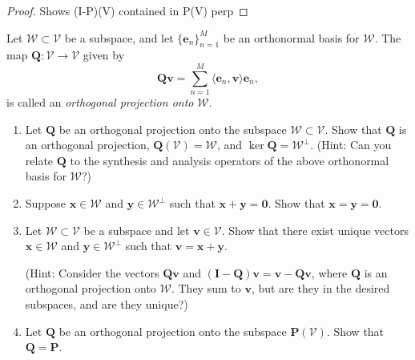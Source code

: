 \documentclass[12pt]{amsart}
\newcommand{\1}{\mathbbm{1}}
\numberwithin{equation}{section}
\numberwithin{Theorem}{section}
\theoremstyle{plain} %
\theoremstyle{definition}
\theoremstyle{remark}
\begin{document}
\begin{enumerate}[1.]
\begin{enumerate}[(a)]
\begin{proof}
		Shows (I-P)(V)  contained in P(V) perp
		
		
	\end{proof}
	
\end{enumerate}

\clearpage

\noindent Let \(\mathcal{W}\subset\mathcal{V}\) be a subspace, and let \(\{\mathbf{e}_{n}\}_{n=1}^{M}\) be an orthonormal basis for \(\mathcal{W}\). The map \(\mathbf{Q}:\mathcal{V}\to\mathcal{V}\) given by
\[\mathbf{Qv} = \sum_{n=1}^{M}\langle \mathbf{e}_{n},\mathbf{v}\rangle\mathbf{e}_{n},\]
is called an \textit{orthogonal projection onto }\(\mathcal{W}\).\bigskip

\begin{enumerate}
\addtocounter{enumii}{3}

\item  Let \(\mathbf{Q}\) be an orthogonal projection onto the subspace \(\mathcal{W}\subset\mathcal{V}\). Show that \(\mathbf{Q}\) is an orthogonal projection, \(\mathbf{Q}(\mathcal{V}) = \mathcal{W}\), and \(\operatorname{ker}\mathbf{Q} = \mathcal{W}^{\bot}\). (Hint: Can you relate \(\mathbf{Q}\) to the synthesis and analysis operators of the above orthonormal basis for \(\mathcal{W}\)?)\bigskip

\item Suppose \(\mathbf{x}\in\mathcal{W}\) and \(\mathbf{y}\in\mathcal{W}^{\bot}\) such that \(\mathbf{x}+\mathbf{y}=\mathbf{0}\). Show that \(\mathbf{x}=\mathbf{y}=\mathbf{0}\).\bigskip

\item Let \(\mathcal{W}\subset\mathcal{V}\) be a subspace and let \(\mathbf{v}\in\mathcal{V}\). Show that there exist unique vectors \(\mathbf{x}\in\mathcal{W}\) and \(\mathbf{y}\in\mathcal{W}^{\bot}\) such that \(\mathbf{v} = \mathbf{x}+\mathbf{y}\).

(Hint: Consider the vectors \(\mathbf{Qv}\) and \((\mathbf{I}-\mathbf{Q})\mathbf{v} = \mathbf{v} -\mathbf{Qv}\), where \(\mathbf{Q}\) is an orthogonal projection onto \(\mathcal{W}\). They sum to \(\mathbf{v}\), but are they in the desired subspaces, and are they unique?)\bigskip

\item Let \(\mathbf{Q}\) be an orthogonal projection onto the subspace \(\mathbf{P}(\mathcal{V})\). Show that \(\mathbf{Q}=\mathbf{P}\).\bigskip

\end{enumerate}


\end{enumerate}
\end{document}
